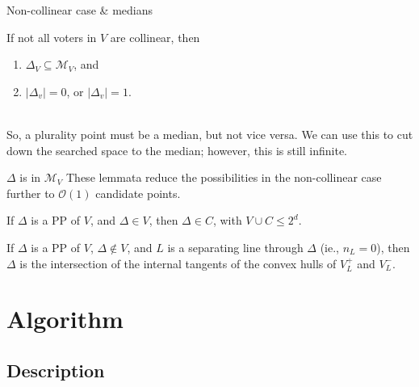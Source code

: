 \documentclass{beamer}
\newcommand{\order}[1]{\ensuremath{\mathcal{O}(#1)}}
\begin{document}
\begin{frame}{Non-collinear case \& medians}
  \begin{lemma}  %
    If not all voters in \(V\) are collinear, then
    \begin{enumerate}
    \item \(\Delta_V \subseteq \mathcal{M}_V\), and
    \item \(\lvert\Delta_{v}\rvert = 0\), or \(\lvert\Delta_{v}\rvert = 1\).
    \end{enumerate}
  \end{lemma} ~\\
  So, a plurality point must be a median, but not vice versa.  We can use this to cut down the
  searched space to the median; however, this is still infinite.
\end{frame}


\begin{frame}{\(\Delta\) is in \(\mathcal{M}_V\)}
  These lemmata reduce the possibilities in the non-collinear case further to \order{1} candidate
  points.
  \begin{lemma}[\(\Delta \in V\)]  %
    If \(\Delta\) is a PP of \(V\), and \(\Delta \in V\), then \(\Delta \in C\), with
    \(V \cup C \leq 2^d\).
  \end{lemma}
  \begin{lemma} %
    If \(\Delta\) is a PP of \(V\), \(\Delta \not\in V\), and \(L\) is a separating line through
    \(\Delta\) (ie., \(n_L = 0\)), then \(\Delta\) is the intersection of the internal tangents of
    the convex hulls of \(V_L^+\) and \(V_L^-\).
  \end{lemma}
\end{frame}


\section{Algorithm}

\subsection{Description}
\let\oldcomment\Comment
\renewcommand{\Comment}[1]{\oldcomment{\textit{#1}}}
\end{document}
